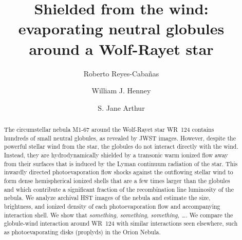 \documentclass[twocolumn, times]{aastex631}
\begin{document}
\title{Shielded from the wind: evaporating neutral globules around a Wolf-Rayet star}
\author[0000-0000-0000-0000]{Roberto Reyes-Cabañas}

\author[0000-0001-6208-9109]{William J. Henney}


\author[0000-0002-5456-4472]{S. Jane Arthur}


\begin{abstract}
  The circumstellar nebula M1-67 around the Wolf-Rayet star WR~124
  contains hundreds of small neutral globules, as revealed by JWST images.
  However, despite the powerful stellar wind from the star, the globules
  do not interact directly with the wind.
  Instead, they are hydrodynamically shielded by a transonic warm ionized
  flow away from their surfaces that is induced by the Lyman continuum radiation
  of the star.
  This inwardly directed photoevaporation flow shocks against the
  outflowing stellar wind to form dense hemispherical ionized shells
  that are a few times larger than the globules
  and which contribute a significant fraction of the recombination line luminosity
  of the nebula.
  We analyze archival HST images of the nebula and estimate the size, brightness,
  and ionized density of each photoevaporation flow and accompanying interaction shell.
  We show that \textit{something, something, something, \dots}.
  We compare the globule-wind interaction around WR~124 with similar interactions
  seen elsewhere, such as photoevaporating disks (proplyds) in the Orion Nebula.
\end{abstract}
\end{document}
